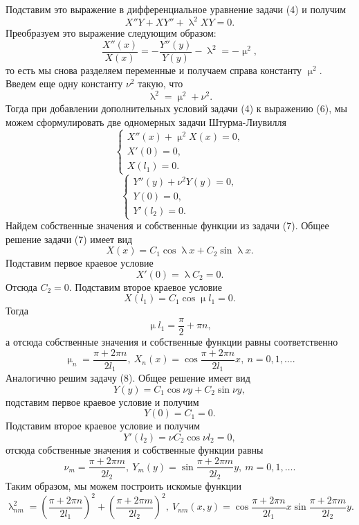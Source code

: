 \documentclass[a4paper, 12pt]{report}
\numberwithin{equation}{section}
\renewcommand{\lambda}{\uplambda}
\renewcommand{\mu}{\upmu}
\begin{document}
	Подставим это выражение в дифференциальное уравнение задачи (4) и получим
	$$X'' Y + X Y'' + \lambda ^2 XY = 0.$$
	Преобразуем это выражение следующим образом:
	\begin{equation}
		\dfrac{X''(x)}{X(x)} = - \dfrac{Y''(y)}{Y(y)} - \lambda^2 = - \mu^2,
	\end{equation}
	то есть мы снова разделяем переменные и получаем справа константу $\mu^2$.
	Введем еще одну константу $\nu ^2$ такую, что 
	$$\lambda^2 = \mu^2 + \nu^2.$$
	Тогда при добавлении дополнительных условий задачи (4) к выражению (6), мы можем сформулировать две одномерных задачи Штурма-Лиувилля 
	\begin{equation}
		\begin{cases}
			X''(x) + \mu^2 X(x) = 0,\\
			X'(0) = 0,\\
			X(l_1) = 0.
		\end{cases}
	\end{equation}
	\begin{equation}
		\begin{cases}
			Y''(y) + \nu^2 Y(y) = 0,\\
			Y(0) = 0,\\
			Y'(l_2) = 0.
		\end{cases}
	\end{equation}
	Найдем собственные значения и собственные функции из задачи (7). Общее решение задачи (7) имеет вид
	$$X(x) = C_1 \cos \lambda x + C_2 \sin \lambda x.$$
	Подставим первое краевое условие
	$$X'(0) = \lambda C_2  = 0.$$
	Отсюда $C_2 = 0$. Подставим второе краевое условие
	$$X(l_1) = C_1 \cos \mu l_1=0.$$
	Тогда 
	$$\mu l_1 = \dfrac{\pi}{2} + \pi n,$$
	а отсюда собственные значения и собственные функции равны соответственно
	\begin{equation}
		\mu_n = \dfrac{\pi + 2\pi n}{2l_1},\ X_n(x) = \cos \dfrac{\pi + 2\pi n}{2l_1}x,\ n=0,1,\ldots.
	\end{equation}
	Аналогично решим задачу (8). Общее решение имеет вид
	$$Y(y) = C_1 \cos \nu y + C_2 \sin \nu y,$$
	подставим первое краевое условие и получим
	$$Y(0) = C_1 = 0.$$
	Подставим второе краевое условие и получим
	$$Y'(l_2) = \nu C_2 \cos \nu l_2 =0,$$
	отсюда собственные значения и собственные функции равны
	\begin{equation}
		\nu_m = \dfrac{\pi + 2\pi m}{2l_2},\ Y_m(y) = \sin \dfrac{\pi + 2\pi m}{2l_2}y,\ m=0,1,\ldots.
	\end{equation}
	Таким образом, мы можем построить искомые функции
	\begin{equation}
		\lambda_{nm}^2 = \left(\dfrac{\pi + 2\pi n}{2l_1}\right)^2 + \left(\dfrac{\pi + 2\pi m}{2l_2}\right)^2, \ V_{nm}(x,y) = \cos \dfrac{\pi + 2\pi n}{2l_1}x\sin \dfrac{\pi + 2\pi m}{2l_2}y.
	\end{equation}
\end{document}

